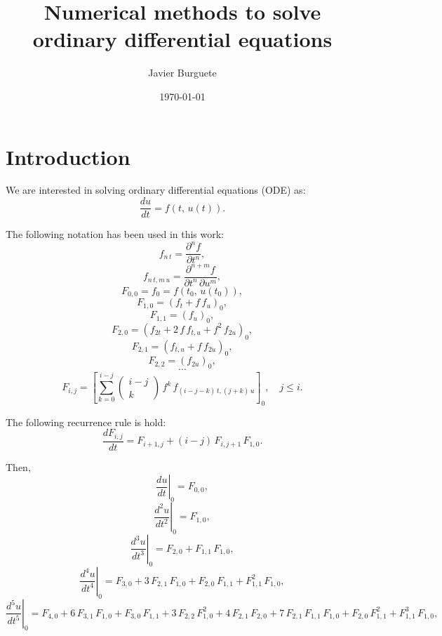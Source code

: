 \documentclass[a4paper]{article}
\title{Numerical methods to solve ordinary differential equations}
\author{Javier Burguete}
\date{\today}
\newcommand{\C}[1]{\left[#1\right]}
\newcommand{\COMB}[2]{\left(\begin{array}{c}#1\\#2\end{array}\right)}
\newcommand{\D}[3]{\DD{^{#3}#1}{#2^{#3}}}
\newcommand{\DD}[2]{\frac{d#1}{d#2}}
\newcommand{\EQ}[2]{\begin{equation}#1\label{#2}\end{equation}}
\newcommand{\PA}[1]{\left(#1\right)}
\newcommand{\PARTIAL}[2]{\frac{\partial #1}{\partial #2}}
\begin{document}
\maketitle

\tableofcontents

\section{Introduction}

We are interested in solving ordinary differential equations (ODE) as:
\EQ{\DD{u}{t}=f\PA{t,\,u(t)}.}{EqODE}

The following notation has been used in this work:
\[f_{n\,t}=\PARTIAL{^nf}{t^n},\]
\[f_{n\,t,m\,u}=\PARTIAL{^{n+m}f}{t^n\,\partial u^m},\]
\[F_{0,0}=f_0=f\PA{t_0,\,u\PA{t_0}},\]
\[F_{1,0}=\PA{f_t+f\,f_u}_0,\]
\[F_{1,1}=\PA{f_u}_0,\]
\[F_{2,0}=\PA{f_{2t}+2\,f\,f_{t,u}+f^2\,f_{2u}}_0,\]
\[F_{2,1}=\PA{f_{t,u}+f\,f_{2u}}_0,\]
\[F_{2,2}=\PA{f_{2u}}_0,\]
\[\cdots\]
\[
	F_{i,j}=\C{\sum_{k=0}^{i-j}\COMB{i-j}{k}\,f^k\,f_{(i-j-k)\,t,(j+k)\,u}}_0,
	\quad j\leq i.
\]

The following recurrence rule is hold:
\EQ{\DD{F_{i,j}}{t}=F_{i+1,j}+(i-j)\,F_{i,j+1}\,F_{1,0}.}{EqdF}

Then,
\[\left.\DD{u}{t}\right|_0=F_{0,0},\]
\[\left.\D{u}{t}{2}\right|_0=F_{1,0},\]
\[\left.\D{u}{t}{3}\right|_0=F_{2,0}+F_{1,1}\,F_{1,0},\]
\[
	\left.\D{u}{t}{4}\right|_0=F_{3,0}+3\,F_{2,1}\,F_{1,0}+F_{2,0}\,F_{1,1}
	+F_{1,1}^2\,F_{1,0},
\]
\[
	\left.\D{u}{t}{5}\right|_0=F_{4,0}+6\,F_{3,1}\,F_{1,0}+F_{3,0}\,F_{1,1}
	+3\,F_{2,2}\,F_{1,0}^2+4\,F_{2,1}\,F_{2,0}+7\,F_{2,1}\,F_{1,1}\,F_{1,0}
	+F_{2,0}\,F_{1,1}^2+F_{1,1}^3\,F_{1,0},
\]
\end{document}
